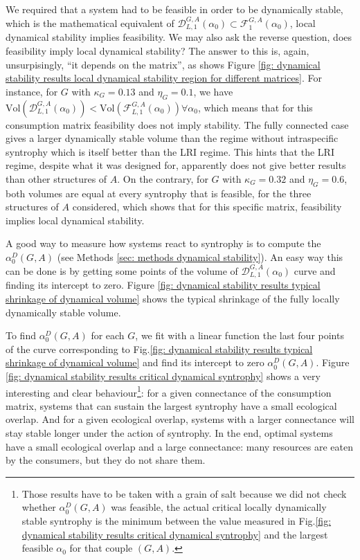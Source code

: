 \documentclass[12pt, titlepage]{report}
\begin{document}
We required that a system had to be feasible in order to be dynamically stable, which is the mathematical equivalent of $\mathcal{D}_{L,1}^{G,A}(\alpha_0) \subset \mathcal{F}_1^{G,A}\left(\alpha_0\right)$, \ie local dynamical stability implies feasibility. We may also ask the reverse question, does feasibility imply local dynamical stability?
The answer to this is, again, unsurpisingly, ``it depends on the matrix'', as shows Figure \ref{fig: dynamical stability results local dynamical stability region for different matrices}. For instance, for $G$ with $\kappa_G=0.13$ and $\eta_G=0.1$, we have $\text{Vol}\left(\mathcal{D}_{L,1}^{G,A}(\alpha_0)\right) < \text{Vol}\left(\mathcal{F}_{L,1}^{G,A}(\alpha_0)\right) \forall \alpha_0$, which means that for this consumption matrix feasibility does not imply stability. The fully connected case gives a larger dynamically stable volume than the regime without intraspecific syntrophy which is itself better than the LRI regime. This hints that the LRI regime, despite what it was designed for, apparently does not give better results than other structures of $A$.
 On the contrary, for $G$ with $\kappa_G=0.32$ and $\eta_G=0.6$, both volumes are equal at every syntrophy that is feasible, for the three structures of $A$ considered, which shows that for this specific matrix, feasibility implies local dynamical stability.

A good way to measure how systems react to syntrophy is to compute the  $\alpha_0^D(G,A)$ (see Methods \ref{sec: methods dynamical stability}). An easy way this can be done is by getting some points of the volume of $\mathcal{D}_{L,1}^{G,A}\left(\alpha_0\right)$ curve and finding its intercept to zero. Figure \ref{fig: dynamical stability results typical shrinkage of dynamical volume} shows the typical shrinkage of the fully locally dynamically stable volume.

To find $\alpha_0^D(G,A)$ for each $G$, we fit with a linear function the last four points of the curve corresponding to Fig.\ref{fig: dynamical stability results typical shrinkage of dynamical volume} and find its intercept to zero $\alpha_0^D(G,A)$. Figure \ref{fig: dynamical stability results critical dynamical syntrophy} shows a very interesting and clear behaviour\footnote{Those results have to be taken with a grain of salt because we did not check whether $\alpha_0^D(G,A)$ was feasible, \ie the actual critical locally dynamically stable syntrophy is the minimum between the value measured in Fig.\ref{fig: dynamical stability results critical dynamical syntrophy} and the largest feasible $\alpha_0$ for that couple $(G,A)$.}: for a given connectance of the consumption matrix, systems that can sustain the largest syntrophy have a small ecological overlap. And for a given ecological overlap, systems with a larger connectance will stay stable longer under the action of syntrophy. In the end, optimal systems have a small ecological overlap and a large connectance: many resources are eaten by the consumers, but they do not share them.
\end{document}
